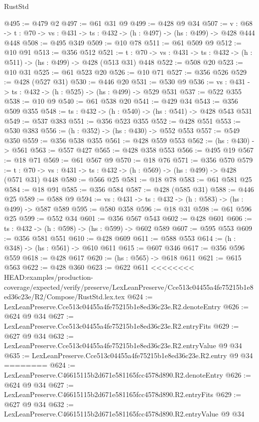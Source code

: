 \begin{lexlean}{RustStd}
\begin{coremodule}
{\begin{coremodule}
@495 := @479 @2
@497 := @61 @31 @9
@499 := @428 @9 @34
@507 := {v : @68} ->
  {t : @70} -> {vs : @431} -> {ts : @432} -> (h : @497) -> (hs : @499) -> @428 @444 @448
@508 := @495 @349
@509 := @10 @78
@511 := @61 @509 @9
@512 := @10 @91
@513 := @356 @512
@521 := {t : @70} -> {vs : @431} -> {ts : @432} -> (h : @511) -> (hs : @499) -> @428 (@513 @31) @448
@522 := @508 @20
@523 := @10 @31
@525 := @61 @523 @20
@526 := @10 @71
@527 := @356 @526
@529 := @428 (@527 @31)
@530 := @446 @20
@531 := @530 @9
@536 := {vs : @431} -> {ts : @432} -> (h : @525) -> (hs : @499) -> @529 @531
@537 := @522 @355
@538 := @10 @9
@540 := @61 @538 @20
@541 := @429 @34
@543 := @356 @509 @355
@548 := {ts : @432} -> (h : @540) -> (hs : @541) -> @428 @543 @531
@549 := @537 @383
@551 := @356 @523 @355
@552 := @428 @551
@553 := @530 @383
@556 := (h : @352) -> (hs : @430) -> @552 @553
@557 := @549 @350
@559 := @356 @538 @355
@561 := @428 @559 @553
@562 := (hs : @430) -> @561
@563 := @557 @427
@565 := @428 @358 @553
@566 := @495 @19
@567 := @18 @71
@569 := @61 @567 @9
@570 := @18 @76
@571 := @356 @570
@579 := {t : @70} -> {vs : @431} -> {ts : @432} -> (h : @569) -> (hs : @499) -> @428 (@571 @31) @448
@580 := @566 @25
@581 := @18 @78
@583 := @61 @581 @25
@584 := @18 @91
@585 := @356 @584
@587 := @428 (@585 @31)
@588 := @446 @25
@589 := @588 @9
@594 := {vs : @431} -> {ts : @432} -> (h : @583) -> (hs : @499) -> @587 @589
@595 := @580 @358
@596 := @18 @31
@598 := @61 @596 @25
@599 := @552 @34
@601 := @356 @567 @543
@602 := @428 @601
@606 := {ts : @432} -> (h : @598) -> (hs : @599) -> @602 @589
@607 := @595 @553
@609 := @356 @581 @551
@610 := @428 @609
@611 := @588 @553
@614 := (h : @348) -> (hs : @561) -> @610 @611
@615 := @607 @346
@617 := @356 @596 @559
@618 := @428 @617
@620 := (hs : @565) -> @618 @611
@621 := @615 @563
@622 := @428 @360
@623 := @622 @611
<<<<<<<< HEAD:examples/production-coverage/expected/verify/preserve/LexLeanPreserve/Cce513c04455a4fe75215b1e8ed36c23e/R2/Compose/RustStd.lex.tex
@624 := LexLeanPreserve.Cce513c04455a4fe75215b1e8ed36c23e.R2.denoteEntry
@626 := @624 @9 @34
@627 := LexLeanPreserve.Cce513c04455a4fe75215b1e8ed36c23e.R2.entryFits
@629 := @627 @9 @34
@632 := LexLeanPreserve.Cce513c04455a4fe75215b1e8ed36c23e.R2.entryValue @9 @34
@635 := LexLeanPreserve.Cce513c04455a4fe75215b1e8ed36c23e.R2.entry @9 @34
========
@624 := LexLeanPreserve.C46615115b2d671e581165fcc4578d890.R2.denoteEntry
@626 := @624 @9 @34
@627 := LexLeanPreserve.C46615115b2d671e581165fcc4578d890.R2.entryFits
@629 := @627 @9 @34
@632 := LexLeanPreserve.C46615115b2d671e581165fcc4578d890.R2.entryValue @9 @34

\end{coremodule}}
\end{coremodule}
\end{lexlean}
